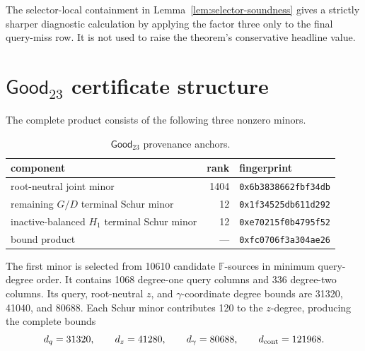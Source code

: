 The selector-local containment in Lemma~\ref{lem:selector-soundness} gives a
strictly sharper diagnostic calculation by applying the factor three only to
the final query-miss row.  It is not used to raise the theorem's conservative
headline value.

\section{\texorpdfstring{\(\mathsf{Good}_{23}\)}{Good23} certificate structure}
\label{app:good23-certificate}

The complete product consists of the following three nonzero minors.
\begin{table}[ht]
\centering
\caption{\(\mathsf{Good}_{23}\) provenance anchors.}
\label{tab:good23-fingerprints}
\begin{tabular}{@{}lrl@{}}
\toprule
component & rank & fingerprint \\
\midrule
root-neutral joint minor & 1404 & \texttt{0x6b3838662fbf34db} \\
remaining \(G/D\) terminal Schur minor & 12 & \texttt{0x1f34525db611d292} \\
inactive-balanced \(H_1\) terminal Schur minor & 12 & \texttt{0xe70215f0b4795f52} \\
bound product & --- & \texttt{0xfc0706f3a304ae26} \\
\bottomrule
\end{tabular}
\end{table}

The first minor is selected from 10610 candidate \(\mathbb F\)-sources in
minimum query-degree order.  It contains 1068 degree-one query columns and
336 degree-two columns.  Its query, root-neutral \(z\), and
\(\gamma\)-coordinate degree bounds are 31320, 41040, and 80688.  Each Schur
minor contributes 120 to the \(z\)-degree, producing the complete bounds
\[
 d_q=31320,\qquad d_z=41280,\qquad
 d_\gamma=80688,\qquad d_{\rm cont}=121968.
\]

